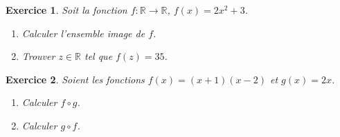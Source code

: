 \documentclass[12pt]{article}
\newtheorem{exercice}{\bf Exercice}
\newtheorem{correction}{\bf Correction exercice}
\newenvironment{exo}{
\begin{exercice}\smallskip\normalfont}{\end{exercice}
}
\newenvironment{cor}{
\begin{correction}\smallskip\normalfont}{\end{correction}
}
\newcommand*{\R}{\mathbb{R}}
\newif\ifcorrige\corrigefalse
\begin{document}

\begin{exo} Soit la fonction $f : \R \to \R$, $f(x) = 2x^2+3$.
\begin{multicols}{2}
\begin{enumerate}
\item Calculer l'ensemble image de $f$.
\item Trouver $z\in\R$ tel que $f(z) = 35$.
\end{enumerate}
\end{multicols}
\end{exo}

\ifcorrige
\color{magenta}
\begin{cor}
  $\qquad$
\begin{enumerate}
\item Lorsque $x$ parcourt $\R$, $2x^2$ parcourt $[0,+\infty[$ et donc $2x^2+3$ parcourt $[3,+\infty[$.
  On a $\text{Im}(f) = [3,+\infty[$.
\item Commen\c{c}ons par remarquer que $35 \in \text{Im}(f)$.
  Il existe donc au moins un $z \in \R$ satisfaisant $f(z) = 35$.
  On r\'esout l'\'equation suivante :
  \begin{align*}
    f(z) = 35
    \iff
    2z^2+3 = 35
    \iff
    2z^2 = 32
    \iff
    z^2 = 16
    \iff
    z = 4 \text{  ou  } z = -4
  \end{align*}
  Il existe donc deux $z \in \R$ tels que $f(z) = 35$ :
  $z=-4$ et $z=4$.
\end{enumerate}
\end{cor}
\color{black}
\fi


\begin{exo} Soient les fonctions $f(x) = (x+1)(x-2)$
  et $g(x) = 2x$.
\begin{multicols}{2}
\begin{enumerate}
\item Calculer $f \circ g$.
\item Calculer $g \circ f$.
\end{enumerate}
\end{multicols}
\end{exo}

\ifcorrige
\color{magenta}
\begin{cor}
  $\qquad$
\begin{enumerate}
\item On a
    $(f \circ g) (x) = f(g(x)) = (g(x)+1)(g(x)-2) = (2x+1)(2x-2)$
\item On a
    $(g \circ f) (x) = g(f(x)) = 2 f(x) = 2(x+1)(x-2)$
\end{enumerate}
\end{cor}
\color{black}
\fi
\end{document}

